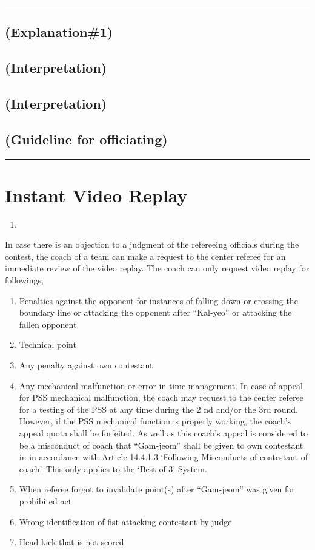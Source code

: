 \documentclass[draft]{report}
\providecommand{\tightlist}{%
  \setlength{\itemsep}{0pt}\setlength{\parskip}{0pt}}
\renewcommand{\labelenumi}{\arabic{enumi}}
\newenvironment{expl}[0]%
  {\rule{\textwidth}{.2pt}\footnotesize}%
  {\rule{\textwidth}{.2pt}\normalsize}
\begin{document}
\begin{expl}
\section{(Explanation\#1)}

\section{(Interpretation)}

\section{(Interpretation)}

\section{(Guideline for officiating)}

\end{expl}


\chapter{Instant Video Replay}\label{ivr}


\begin{enumerate}
\def\labelenumi{\arabic{enumi}.}
\tightlist
\item
\end{enumerate}

In case there is an objection to a judgment of the refereeing officials
during the contest, the coach of a team can make a request to the center
referee for an immediate review of the video replay. The coach can only
request video replay for followings;

\begin{enumerate}
\def\labelenumi{\roman{enumi})}
\tightlist
\item
  Penalties against the opponent for instances of falling down or
  crossing the boundary line or attacking the opponent after ``Kal-yeo''
  or attacking the fallen opponent
\item
  Technical point
\item
  Any penalty against own contestant
\item
  Any mechanical malfunction or error in time management. In case of
  appeal for PSS mechanical malfunction, the coach may request to the
  center referee for a testing of the PSS at any time during the 2 nd
  and/or the 3rd round. However, if the PSS mechanical function is
  properly working, the coach's appeal quota shall be forfeited. As well
  as this coach's appeal is considered to be a misconduct of coach that
  ``Gam-jeom'' shall be given to own contestant in in accordance with
  Article 14.4.1.3 `Following Misconducts of contestant of coach'. This
  only applies to the `Best of 3' System.
\item
  When referee forgot to invalidate point(s) after ``Gam-jeom'' was
  given for prohibited act
\item
  Wrong identification of fist attacking contestant by judge
\item
  Head kick that is not scored
\end{enumerate}
\end{document}
